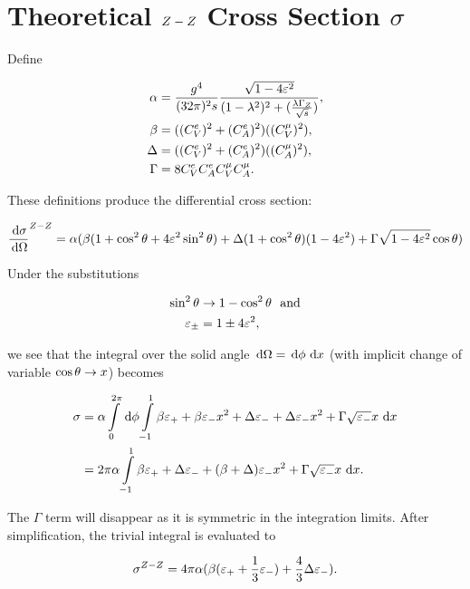 \documentclass[]{report}
\begin{document}
\section{Theoretical $Z -Z $ Cross Section $\sigma$}

Define

\begin{align*}
\alpha &= \frac{g^{4}}{(32\pi)^{2}s} \frac{\sqrt{1-4\varepsilon^{2}}}{(1-\lambda^{2})^{2} + (\frac{\lambda\Gamma_{\Zzero}}{\rts})},
\\
\beta &= ((C_{V}^{e})^{2} + (C_{A}^{e})^{2})((C_{V}^{\mu})^{2}),
\\
\Delta &= ((C_{V}^{e})^{2} + (C_{A}^{e})^{2})((C_{A}^{\mu})^{2}),
\\
\Gamma &= 8C_{V}^{e}C_{A}^{e}C_{V}^{\mu}C_{A}^{\mu}.
\end	{align*}

These definitions produce the differential cross section:

$$
\frac{\,\operatorname{d}\!{\sigma}}{\,\operatorname{d}\!{\Omega}}^{Z -Z }
  = \alpha(\beta(1+\cos^{2}{\theta}+4\varepsilon^{2}\sin^{2}{\theta})
    + \Delta(1+\cos^{2}{\theta})(1-4\varepsilon^{2})
    + \Gamma\sqrt{1-4\varepsilon^{2}}\cos{\theta}
  )
$$

Under the substitutions

\begin{align*}
\sin^{2}{\theta} &\rightarrow 1-\cos^{2}{\theta} \,\,\,\,\rm{and}\\
\varepsilon_{\pm} &= 1\pm4\varepsilon^{2},
\end{align*}

we see that the integral over the solid angle $\,\operatorname{d}\!{\Omega} = \,\operatorname{d}\!{\phi}\,\operatorname{d}\!{x}$ (with implicit change of variable $\cos{\theta}\rightarrow x$) becomes

\begin{align*}
\sigma &= \alpha\int\limits_{0}^{2\pi}\d{\phi}\int\limits_{-1}^{1}
  \beta\varepsilon_{+} + \beta\varepsilon_{-}x^{2} + \Delta\varepsilon_{-}
  + \Delta\varepsilon_{-}x^{2} + \Gamma\sqrt{\varepsilon_{-}}x
  \d{x}
  \\
  &= 2\pi\alpha\int\limits_{-1}^{1}
    \beta\varepsilon_{+} + \Delta\varepsilon_{-} + (\beta + \Delta)\varepsilon_{-}x^{2}
    + \Gamma\sqrt{\varepsilon_{-}}x
    \d{x}.
\end{align*}

The $\Gamma$ term will disappear as it is symmetric in the integration limits. After simplification, the trivial integral is evaluated to

$$
\sigma^{\Zzero-\Zzero} = 4\pi\alpha(\beta(\varepsilon_{+} + \frac{1}{3}\varepsilon_{-})
  + \frac{4}{3}\Delta\varepsilon_{-}).
$$
\end{document}
